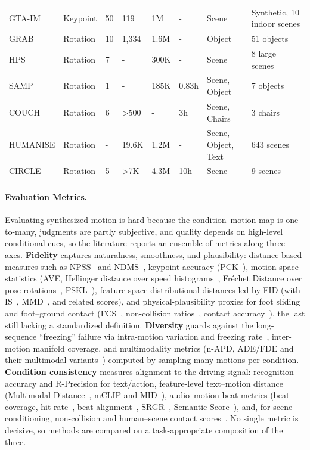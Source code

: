 \begin{table}[htbp]
\begin{tabular}{L{0.18\textwidth} C{0.115\textwidth} C{0.07\textwidth} C{0.08\textwidth} C{0.06\textwidth} C{0.06\textwidth} C{0.13\textwidth} L{0.17\textwidth}}
GTA-IM \cite{CaoGMCVM20} & Keypoint & 50 & 119 & 1M & - & Scene & Synthetic, 10 indoor scenes \\
GRAB \cite{TaheriGBT20} & Rotation & 10 & 1,334 & 1.6M & - & Object & 51 objects \\
HPS \cite{GuzovMSP21} & Rotation & 7 & - & 300K & - & Scene & 8 large scenes\\
SAMP \cite{HassanCVSYZB21} & Rotation & 1 & - & 185K & 0.83h & Scene, Object & 7 objects\\
COUCH \cite{ZhangBSGP22} & Rotation & 6 & >500 & - & 3h & Scene, Chairs & 3 chairs\\
HUMANISE \cite{WangCLZLH22} & Rotation & - & 19.6K & 1.2M & - & Scene, Object, Text & 643 scenes \\
CIRCLE \cite{AraujoLVAWGCL23} & Rotation & 5 & >7K & 4.3M & 10h & Scene & 9 scenes \\
\bottomrule
\end{tabular}
\end{table}

\paragraph{Evaluation Metrics.} Evaluating synthesized motion is hard because the condition--motion map is one-to-many, judgments are partly subjective, and quality depends on high-level conditional cues, so the literature reports an ensemble of metrics along three axes.
\textbf{Fidelity} captures naturalness, smoothness, and plausibility: distance-based measures such as NPSS~\cite{GopalakrishnanM19} and NDMS~\cite{TankeZG21}, keypoint accuracy (PCK~\cite{YangR13}), motion-space statistics (AVE, Hellinger distance over speed histograms~\cite{yang2023qpgesture}, Fréchet Distance over pose rotations~\cite{HassanCVSYZB21, 0003RLYLD22}, PSKL~\cite{RuizGM19}), feature-space distributional distances led by FID (with IS~\cite{AhujaLNM20}, MMD~\cite{YuZLYC20}, and related scores), and physical-plausibility proxies for foot sliding and foot--ground contact (FCS~\cite{TsengCL23}, non-collision ratios~\cite{WuWZZHYT22}, contact accuracy~\cite{ZhangT22}), the last still lacking a standardized definition.
\textbf{Diversity} guards against the long-sequence ``freezing'' failure via intra-motion variation and freezing rate~\cite{SunWHLJH22}, inter-motion manifold coverage, and multimodality metrics (n-APD, ADE/FDE and their multimodal variants~\cite{YuanK20}) computed by sampling many motions per condition.
\textbf{Condition consistency} measures alignment to the driving signal: recognition accuracy and R-Precision for text/action, feature-level text--motion distance (Multimodal Distance~\cite{GuoZZ0JL022}, mCLIP and MID~\cite{KimKC23}), audio--motion beat metrics (beat coverage, hit rate~\cite{LeeY0WLYK19}, beat alignment~\cite{LiYRK21}, SRGR~\cite{LiuZIPLZBZ22}, Semantic Score~\cite{AoZL23}), and, for scene conditioning, non-collision and human--scene contact scores~\cite{WuWZZHYT22, ZhangBSGP22}. No single metric is decisive, so methods are compared on a task-appropriate composition of the three.


